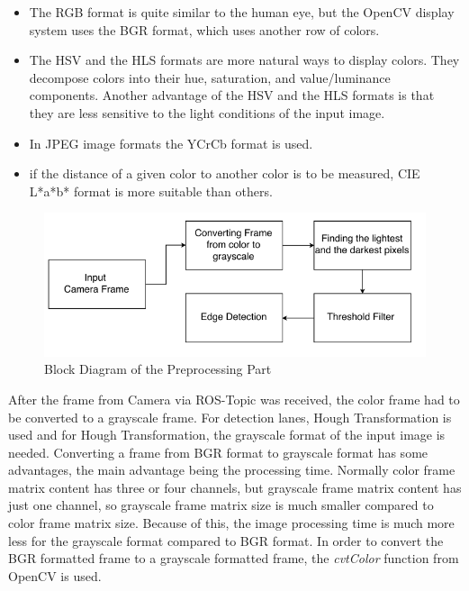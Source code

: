 \begin{itemize}

\item The RGB format is quite similar to the human eye, but the OpenCV display system uses the BGR format, which uses another row of colors.  

\item The HSV and the HLS formats are more natural ways to display colors. They decompose colors into their hue, saturation, and value/luminance components. Another advantage of the HSV and the HLS formats is that they are less sensitive to the light conditions of the input image.

\item In JPEG image formats the YCrCb format is used.

\item if the distance of a given color to another color is to be measured, CIE L*a*b* format is more suitable than others.

\end{itemize}




\begin{figure}[H]
 \centering
  \includegraphics[width=1\textwidth]{./Bilder/Presprocessing_Figure.png}	
  \caption{Block Diagram of the Preprocessing Part}
  \label{fig:Block_Diagram_of_the_Preprocessing_Part}
\end{figure}





After the frame from Camera via ROS-Topic was received, the color frame had to be converted to a grayscale frame. For detection lanes, Hough Transformation is used and for Hough Transformation, the grayscale format of the input image is needed. Converting a frame from BGR format to grayscale format has some advantages, the main advantage being the processing time. Normally color frame matrix content has three or four channels, but grayscale frame matrix content has just one channel, so grayscale frame matrix size is much smaller compared to color frame matrix size. Because of this, the image processing time is much more less for the grayscale format compared to BGR format. In order to convert the BGR formatted frame to a grayscale formatted frame, the \textit{cvtColor} function from OpenCV is used.

